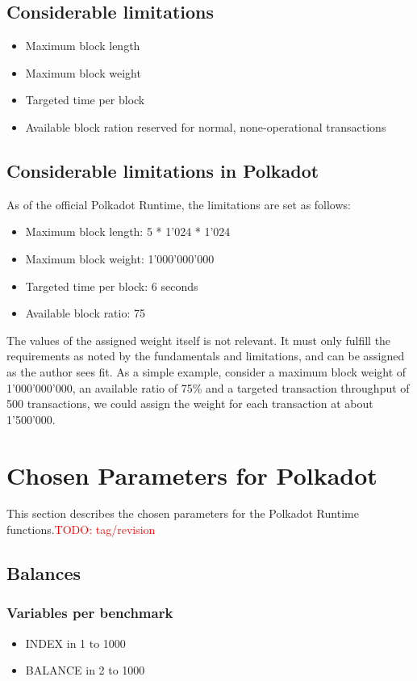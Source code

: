 \documentclass[11pt,a4paper]{article}
\newcommand{\todo}[1]{\textcolor{red}{TODO: #1}}
\begin{document}
\subsection{Considerable limitations}
\begin{itemize}
\item Maximum block length
\item Maximum block weight
\item Targeted time per block
\item Available block ration reserved for normal, none-operational transactions
\end{itemize}

\subsection{Considerable limitations in Polkadot}
As of the official Polkadot Runtime, the limitations are set as follows:

\begin{itemize}
\item Maximum block length: 5 * 1'024 * 1'024
\item Maximum block weight: 1'000'000'000
\item Targeted time per block: 6 seconds
\item Available block ratio: 75%
\end{itemize}

The values of the assigned weight itself is not relevant. It must only fulfill the requirements
as noted by the fundamentals and limitations, and can be assigned as the author sees fit.
As a simple example, consider a maximum block weight of 1'000'000'000, an available ratio of
75\% and a targeted transaction throughput of 500 transactions, we could assign the weight
for each transaction at about 1'500'000.

\section{Chosen Parameters for Polkadot}
This section describes the chosen parameters for the Polkadot Runtime functions.\todo{tag/revision}

\subsection{Balances}

\subsubsection*{Variables per benchmark}
\begin{itemize}
\item INDEX in 1 to 1000
\item BALANCE in 2 to 1000
\end{itemize}
\end{document}
